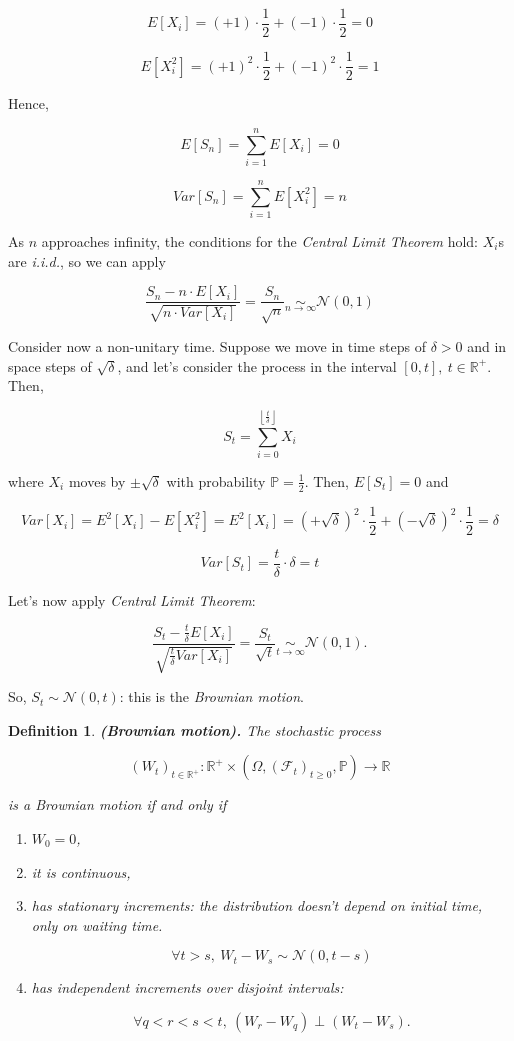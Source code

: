 \documentclass[oneside,titlepage,headinclude,12pt,a4paper,BCOR5mm,footinclude]{book}
\theoremstyle{defn}
\newtheorem{defn}{Definition}
\begin{document}
\[
  E\left[X_i\right] = (+1) \cdot \frac{1}{2} + (-1) \cdot \frac{1}{2} = 0
\]
  
\[
  E\left[X_i^2\right] = (+1)^2 \cdot \frac{1}{2} + (-1)^2 \cdot \frac{1}{2} = 1
\]

Hence,

\[
  E\left[S_n\right] = \sum_{i=1}^n E\left[X_i\right] = 0
\]

\[
  Var\left[S_n\right] = \sum_{i=1}^n E\left[X_i^2\right] = n
\]

As \(n\)  approaches infinity,  the conditions  for the  \textit{Central Limit
Theorem} hold: \(X_i\)s are \textit{i.i.d.}, so we can apply

\[
  \frac{S_n - n \cdot E\left[X_i\right]}{\sqrt{n \cdot Var\left[X_i\right]}}
  = \frac{S_n}{\sqrt{n}} \underset{n \to \infty}{\sim} \mathcal{N}(0,1)
\]

Consider now a non-unitary  time. Suppose we move in time  steps of \(\delta >
0\) and in space steps of \(\sqrt{\delta}\), and let's consider the process in
the interval $[0,t],\ t\in\mathbb{R}^+$. Then,

\[
  S_t = \sum_{i=0}^{\left\lfloor \frac{t}{\delta} \right\rfloor} X_i
\]

where     $X_i$     moves     by     $\pm\sqrt\delta$     with     probability
$\mathbb{P}=\frac{1}{2}$. Then, $E\left[S_t\right]=0$ and

\[
  Var[X_i] = E^2[X_i] - E[X_i^2] = E^2[X_i] = (+\sqrt{\delta})^2 \cdot \frac{1}{2} + (-\sqrt{\delta})^2 \cdot \frac{1}{2} 
    = \delta
\]

\[
  Var[S_t] = \frac{t}{\delta} \cdot \delta = t
\]

Let's now apply \textit{Central Limit Theorem}:

\[
  \frac{S_t - \frac{t}{\delta} E[X_i]}{\sqrt{\frac{t}{\delta} Var[X_i]}}
  = \frac{S_t}{\sqrt{t}} \underset{t \to \infty}{\sim} \mathcal{N}(0,1).
\]

So, $S_t \sim \mathcal{N}(0,t)$: this is the \textit{Brownian motion}.

\begin{defn} 
  \textbf{(Brownian motion).} The stochastic process 

  \[
    (W_t)_{t\in\mathbb{R}^+} : \mathbb{R}^+ \times (\Omega, (\mathcal{F}_t)_{t \geq 0}, \mathbb{P}) \to \mathbb{R}
  \]

  is a Brownian motion if and only if

  \begin{enumerate}[label=(\Roman*)]
    \item $W_0 = 0$,
    \item it is continuous,
    \item  has  stationary  increments:  the distribution  doesn't  depend  on
           initial time, only on waiting time.
      
      $$\forall t > s,\ W_t - W_s \sim \mathcal{N}(0,t-s)$$

    \item has independent increments over disjoint intervals: 
      
      $$\forall q < r < s < t,\ (W_r-W_q) \perp (W_t-W_s).$$
  \end{enumerate}
\end{defn}
\end{document}
